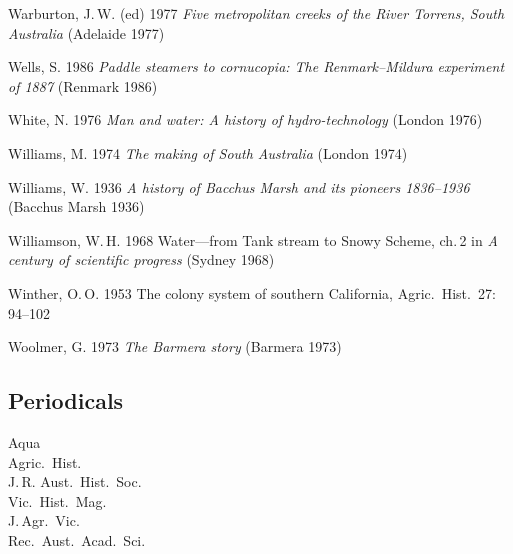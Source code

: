 Warburton, J.\,W. (ed) 1977 \textsl{Five metropolitan creeks of the
River Torrens, South Australia} (Adelaide 1977)

Wells, S.  1986 \textsl{Paddle steamers to cornucopia: The
Renmark--Mildura experiment of 1887} (Renmark 1986)

White, N. 1976 \textsl{Man and water: A history of hydro-technology} (London
1976)

Williams, M. 1974 \textsl{The making of South Australia} (London 1974)

Williams, W.  1936 \textsl{A history of Bacchus Marsh and its pioneers
1836--1936} (Bacchus Marsh 1936)

Williamson, W.\,H. 1968 Water---from Tank stream to Snowy Scheme,
ch.\,2 in \textsl{A century of scientific progress} (Sydney 1968)

Winther, O.\,O.  1953 The colony system of southern California,
Agric.\ Hist.\ 27: 94--102

Woolmer, G.  1973 \textsl{The Barmera story} (Barmera 1973)

\subsection*{Periodicals}
Aqua\\
Agric.\ Hist.\\
J.\,R. Aust.\ Hist.\ Soc.\\
Vic.\ Hist.\ Mag.\\
J.\,Agr.\ Vic.\\
Rec.\ Aust.\ Acad.\ Sci.\\



